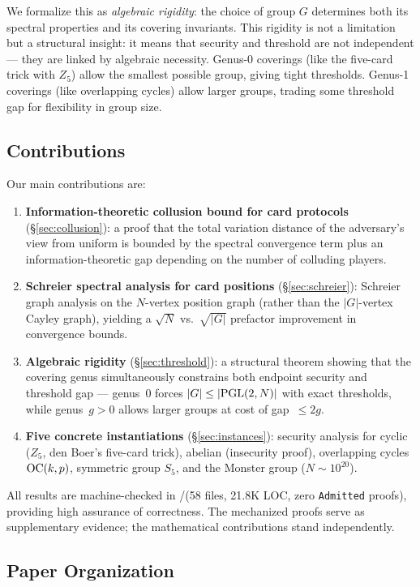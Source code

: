 \documentclass[11pt,a4paper]{article}
\begin{document}
We formalize this as \emph{algebraic rigidity}: the choice of group $G$ determines both its spectral properties and its covering invariants.
This rigidity is not a limitation but a structural insight: it means that security and threshold are not independent — they are linked by algebraic necessity.
Genus-0 coverings (like the five-card trick with $Z_5$) allow the smallest possible group, giving tight thresholds.
Genus-1 coverings (like overlapping cycles) allow larger groups, trading some threshold gap for flexibility in group size.

\subsection*{Contributions}

Our main contributions are:
\begin{enumerate}
  \item \textbf{Information-theoretic collusion bound for card protocols} (\S\ref{sec:collusion}): a proof that the total variation distance of the adversary's view from uniform is bounded by the spectral convergence term plus an information-theoretic gap depending on the number of colluding players.
  \item \textbf{Schreier spectral analysis for card positions} (\S\ref{sec:schreier}): Schreier graph analysis on the $N$-vertex position graph (rather than the $|G|$-vertex Cayley graph), yielding a $\sqrt{N}$ vs.\ $\sqrt{|G|}$ prefactor improvement in convergence bounds.
  \item \textbf{Algebraic rigidity} (\S\ref{sec:threshold}): a structural theorem showing that the covering genus simultaneously constrains both endpoint security and threshold gap --- genus~0 forces $|G| \leq |\mathrm{PGL}(2,N)|$ with exact thresholds, while genus~$g > 0$ allows larger groups at cost of gap~$\leq 2g$.
  \item \textbf{Five concrete instantiations} (\S\ref{sec:instances}): security analysis for cyclic ($Z_5$, den Boer's five-card trick), abelian (insecurity proof), overlapping cycles $\mathrm{OC}(k,p)$, symmetric group $S_5$, and the Monster group ($N \sim 10^{20}$).
\end{enumerate}

All results are machine-checked in \Rocq/\MathComp (58 files, 21.8K LOC, zero \texttt{Admitted} proofs), providing high assurance of correctness.
The mechanized proofs serve as supplementary evidence; the mathematical contributions stand independently.

\subsection*{Paper Organization}
\end{document}
